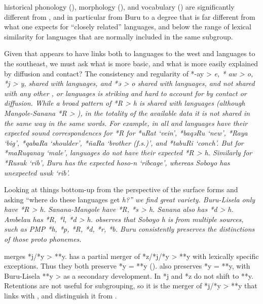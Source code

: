  historical phonology (),
morphology (), and vocabulary () are significantly
different from , and in particular from Buru to a degree that is far different
from what one expects for “closely related” languages,
and below the range of lexical similarity for languages that
are normally included in the same subgroup.

Given that  appears to have links both to 
languages to the west
and  languages to the southeast,
we must ask what is more basic,
and what is more easily explained by diffusion
and contact? The consistency
and regularity of *-ay > \it{e},
* aw > \it{o},
*j > \it{y}, shared with  languages,
and *ə > \it{o} shared with  languages,
and not shared with any other ,
 or  languages
is striking and hard to account for by contact or diffusion.
While a broad pattern of *R > \it{h} is shared with 
languages (although Mangole-Sanana *R > {\0}),
in the totality of the available data it is not shared in the
same way in the same words.
For example, in  all 
and  languages have their expected sound correspondences
for *R for *uRat ‘vein’,
*baqəRu ‘new’, *Raya ‘big’,
*qabaRa ‘shoulder’, *ñaRa ‘brother (f.s.)’, and *tabuRi ‘conch’.
But for *maRuqanay ‘male’,
 languages do not have their expected *R > \it{h}.
Similarly for *Rusuk ‘rib’,
Buru has the expected \it{hoso-n} ‘ribcage’,
whereas Soboyo has unexpected \it{usuk} ‘rib’.

Looking at things bottom-up from the perspective of the surface
forms and asking “where do these languages get \it{h}?” we find great variety.
Buru-Lisela only have  *R > \it{h}.
Sanana-Mangole have *R, *s > \it{h}.
Sanana also has *d > \it{h}.
Ambelau has *R, *l, *d > \it{h}.
\citet{Blust1981} observes that Soboyo \it{h} is from multiple
sources, such as PMP *h,
*p, *R, *d, *r, *b.
Buru consistently preserves the distinctions of those proto phonemes.

 merges *j/*y > **y.
 has a partial merger of *z/*j/*y > **y with lexically specific exceptions.
Thus they both preserve *y = **y ().
 also preserves *y = **y,
with Buru-Lisela **y > {\0} as a secondary development.
In  *j and *z do not shift to **y.
Retentions are not useful for subgrouping,
so it is the merger of *j/*y > **y that links  with
, and distinguish it from .

